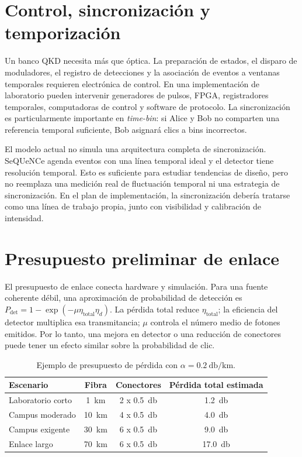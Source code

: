 \section{Control, sincronización y temporización}

Un banco QKD necesita más que óptica. La preparación de estados, el disparo de moduladores, el registro de detecciones y la asociación de eventos a ventanas temporales requieren electrónica de control. En una implementación de laboratorio pueden intervenir generadores de pulsos, FPGA, registradores temporales, computadoras de control y software de protocolo. La sincronización es particularmente importante en \textit{time-bin}: si Alice y Bob no comparten una referencia temporal suficiente, Bob asignará clics a bins incorrectos.

El modelo actual no simula una arquitectura completa de sincronización. SeQUeNCe agenda eventos con una línea temporal ideal y el detector tiene resolución temporal. Esto es suficiente para estudiar tendencias de diseño, pero no reemplaza una medición real de fluctuación temporal ni una estrategia de sincronización. En el plan de implementación, la sincronización debería tratarse como una línea de trabajo propia, junto con visibilidad y calibración de intensidad.

\section{Presupuesto preliminar de enlace}

El presupuesto de enlace conecta hardware y simulación. Para una fuente coherente débil, una aproximación de probabilidad de detección es \(P_\text{det}=1-\exp(-\mu \eta_\text{total}\eta_d)\). La pérdida total reduce \(\eta_\text{total}\); la eficiencia del detector multiplica esa transmitancia; \(\mu\) controla el número medio de fotones emitidos. Por lo tanto, una mejora en detector o una reducción de conectores puede tener un efecto similar sobre la probabilidad de clic.

\begin{table}[H]
  \centering
  \begin{tabular}{lccc}
    \toprule
    Escenario & Fibra & Conectores & Pérdida total estimada \\
    \midrule
    Laboratorio corto & \SI{1}{\kilo\meter} & 2 x \SI{0.5}{\decibel} & \SI{1.2}{\decibel} \\
    Campus moderado & \SI{10}{\kilo\meter} & 4 x \SI{0.5}{\decibel} & \SI{4.0}{\decibel} \\
    Campus exigente & \SI{30}{\kilo\meter} & 6 x \SI{0.5}{\decibel} & \SI{9.0}{\decibel} \\
    Enlace largo & \SI{70}{\kilo\meter} & 6 x \SI{0.5}{\decibel} & \SI{17.0}{\decibel} \\
    \bottomrule
  \end{tabular}
  \caption{Ejemplo de presupuesto de pérdida con \(\alpha=\SI{0.2}{\decibel\per\kilo\meter}\).}
  \label{tab:presupuesto_perdida}
\end{table}


